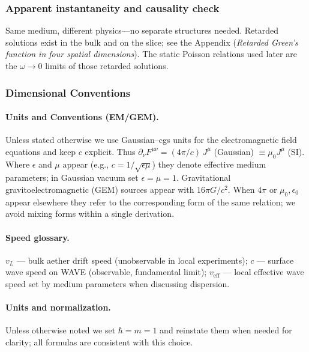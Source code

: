 \subsubsection{Apparent instantaneity and causality check}\label{sec:tsunami-causality}

Same medium, different physics---no separate structures needed. Retarded solutions exist in the bulk and on the slice; see the Appendix (\emph{Retarded Green's function in four spatial dimensions}). The static Poisson relations used later are the $\omega\to0$ limits of those retarded solutions.

\medskip
{}

\subsubsection{Dimensional Conventions}
\paragraph{Units and Conventions (EM/GEM).} Unless stated otherwise we use Gaussian--cgs units for the electromagnetic field equations and keep $c$ explicit. Thus $\partial_\nu F^{\mu\nu} = (4\pi/c)\, J^\mu$ (Gaussian) $\equiv \mu_0 J^\mu$ (SI). Where $\epsilon$ and $\mu$ appear (e.g., $c = 1/\sqrt{\epsilon\mu}$) they denote effective medium parameters; in Gaussian vacuum set $\epsilon=\mu=1$. Gravitational gravitoelectromagnetic (GEM) sources appear with $16\pi G/c^2$. When $4\pi$ or $\mu_0,\epsilon_0$ appear elsewhere they refer to the corresponding form of the same relation; we avoid mixing forms within a single derivation.

\paragraph{Speed glossary.} $v_L$ --- bulk aether drift speed (unobservable in local experiments); $c$ --- surface wave speed on WAVE (observable, fundamental limit); $v_{\text{eff}}$ --- local effective wave speed set by medium parameters when discussing dispersion.

\paragraph{Units and normalization.} Unless otherwise noted we set $\hbar=m=1$ and reinstate them when needed for clarity; all formulas are consistent with this choice.

